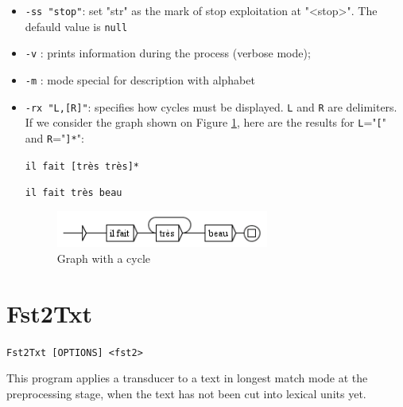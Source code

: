 \begin{itemize}
  \item \verb$-ss "stop"$: set "str" as the mark of stop exploitation at "<stop>".
  The defauld value is \verb$null$

  \item \verb$-v$ : prints information during the process (verbose mode);
  
  \item \verb$-m$ : mode special for description with alphabet
  \item \verb$-rx "L,[R]"$: specifies how cycles must be displayed. \verb$L$ and
  \verb$R$ are delimiters. If we consider the graph shown on Figure \ref{cycle},
  here are the results for \verb$L$="\verb$[$" and \verb$R$="\verb$]*$":

  \medskip
  \noindent
  \texttt{il fait [tr\`es tr\`es]*}
  
  \noindent
  \texttt{il fait tr\`es beau}

\begin{figure}[h]
\begin{center}
\includegraphics[width=7cm]{resources/img/fig10-1.png}
\caption{Graph with a cycle\label{cycle}}
\end{center}
\end{figure}

\end{itemize}







\section{Fst2Txt}
\label{section-Fst2Txt}
\verb+Fst2Txt [OPTIONS] <fst2>+

\bigskip
\noindent This program applies a transducer to a text in longest match mode at the
preprocessing stage, when the text has not been cut into lexical units yet.

